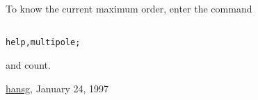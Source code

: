  To know the current maximum order, enter the command 
\begin{verbatim}

help,multipole;
\end{verbatim} and count. 

\href{http://www.cern.ch/hansg/hansg_sign.html}{hansg}, January 24, 1997 

